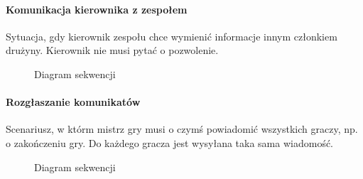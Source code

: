\documentclass[11pt]{article}
\begin{document}
\paragraph{Komunikacja kierownika z zespołem}

Sytuacja, gdy kierownik zespołu chce wymienić informacje innym członkiem drużyny. Kierownik nie musi pytać o pozwolenie.

\begin{figure}[!h]
	\centering
	\caption{Diagram sekwencji}
\end{figure}
\FloatBarrier
\par

\paragraph{Rozgłaszanie komunikatów}

Scenariusz, w którm mistrz gry musi o czymś powiadomić wszystkich graczy, np. o zakończeniu gry. Do każdego gracza jest wysyłana taka sama wiadomość.

\begin{figure}[!h]
	\centering
	\caption{Diagram sekwencji}
		\hspace*{-1.3cm}
\end{figure}
\FloatBarrier
\end{document}
